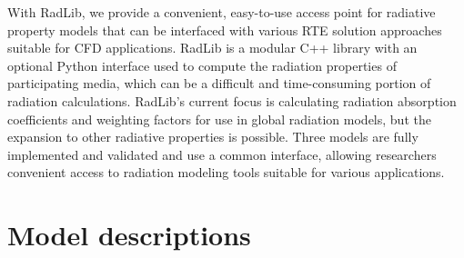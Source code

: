 \documentclass[preprint,12pt, a4paper]{elsarticle}
\begin{document}
With RadLib, we provide a convenient, easy-to-use access point for radiative property models that can be interfaced with various RTE solution approaches suitable for CFD applications. RadLib is a modular C++ library with an optional Python interface used to compute the radiation properties of participating media, which can be a difficult and time-consuming portion of radiation calculations. RadLib's current focus is calculating radiation absorption coefficients and weighting factors for use in global radiation models, but the expansion to other radiative properties is possible. Three models are fully implemented and validated and use a common interface, allowing researchers convenient access to radiation modeling tools suitable for various applications.


\section{Model descriptions} \label{s:models}
\end{document}
